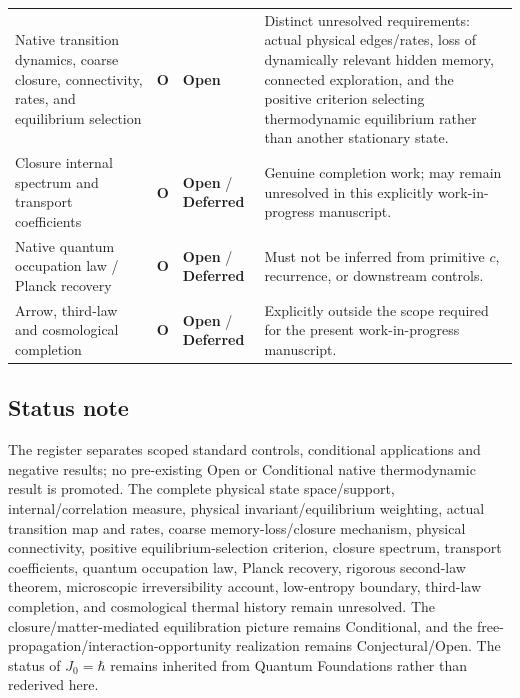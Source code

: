 \documentclass[11pt]{article}
\theoremstyle{definition}
\newcommand{\statusOpen}{\textcolor{red!75!black}{\textbf{Open}}}
\newcommand{\statusDeferred}{\textcolor{gray!70!black}{\textbf{Deferred}}}
\newcommand{\natOpen}{\textcolor{red!70!black}{\textbf{O}}}
\begin{document}
\begin{center}
\begin{longtable}{@{}P{3.5cm}P{1.7cm}P{2.5cm}P{5.6cm}@{}}
Native transition dynamics, coarse closure, connectivity, rates, and equilibrium selection
& \natOpen{} & \statusOpen{}
& Distinct unresolved requirements: actual physical edges/rates, loss of dynamically relevant hidden memory, connected exploration, and the positive criterion selecting thermodynamic equilibrium rather than another stationary state. \\
Closure internal spectrum and transport coefficients
& \natOpen{} & \statusOpen{} / \statusDeferred{}
& Genuine completion work; may remain unresolved in this explicitly work-in-progress manuscript. \\
Native quantum occupation law / Planck recovery
& \natOpen{} & \statusOpen{} / \statusDeferred{}
& Must not be inferred from primitive $c$, recurrence, or downstream controls. \\
Arrow, third-law and cosmological completion
& \natOpen{} & \statusOpen{} / \statusDeferred{}
& Explicitly outside the scope required for the present work-in-progress manuscript. \\
\bottomrule
\end{longtable}
\normalsize
\end{center}

\subsection{Status note}
The register separates scoped standard controls, conditional applications and negative results;
no pre-existing Open or Conditional native thermodynamic result is promoted.  The complete
physical state space/support, internal/correlation measure, physical invariant/equilibrium
weighting, actual transition map and rates, coarse memory-loss/closure mechanism, physical
connectivity, positive equilibrium-selection criterion, closure spectrum, transport
coefficients, quantum occupation law, Planck recovery, rigorous second-law theorem,
microscopic irreversibility account, low-entropy boundary, third-law completion, and
cosmological thermal history remain unresolved.  The closure/matter-mediated equilibration
picture remains Conditional, and the free-propagation/interaction-opportunity realization remains
Conjectural/Open.  The status of $J_0=\hbar$ remains inherited from Quantum Foundations
rather than rederived here.

\newpage

\printbibliography[title={References}]
\end{document}
